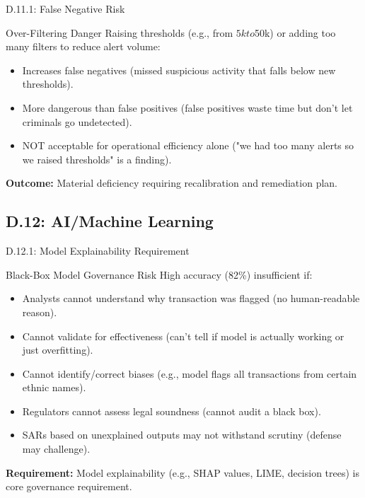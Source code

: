 \documentclass{beamer}
\begin{document}
	\begin{frame}{D.11.1: False Negative Risk}
		\begin{block}{Over-Filtering Danger}
			Raising thresholds (e.g., from $5k to $50k) or adding too many filters to reduce alert volume:
			\begin{itemize}
				\item Increases false negatives (missed suspicious activity that falls below new thresholds).
				\item More dangerous than false positives (false positives waste time but don't let criminals go undetected).
				\item NOT acceptable for operational efficiency alone ("we had too many alerts so we raised thresholds" is a finding).
			\end{itemize}
		\end{block}
		\textbf{Outcome:} Material deficiency requiring recalibration and remediation plan.
	\end{frame}
	
	\subsection{D.12: AI/Machine Learning}
	
	\begin{frame}{D.12.1: Model Explainability Requirement}
		\begin{block}{Black-Box Model Governance Risk}
			High accuracy (82\%) insufficient if:
			\begin{itemize}
				\item Analysts cannot understand why transaction was flagged (no human-readable reason).
				\item Cannot validate for effectiveness (can't tell if model is actually working or just overfitting).
				\item Cannot identify/correct biases (e.g., model flags all transactions from certain ethnic names).
				\item Regulators cannot assess legal soundness (cannot audit a black box).
				\item SARs based on unexplained outputs may not withstand scrutiny (defense may challenge).
			\end{itemize}
		\end{block}
		\textbf{Requirement:} Model explainability (e.g., SHAP values, LIME, decision trees) is core governance requirement.
	\end{frame}
	
\end{document}
